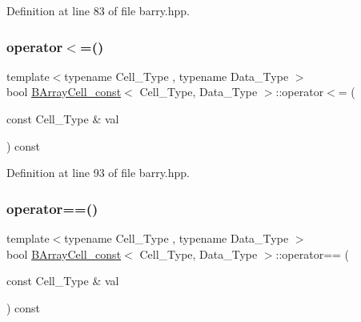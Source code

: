 Definition at line 83 of file barry.\+hpp.

\mbox{\label{classbarry_1_1_b_array_cell__const_a4221856ab5a0b1e149a99e776eee4614}} 
\subsubsection{\texorpdfstring{operator$<$=()}{operator<=()}}
{\footnotesize\ttfamily template$<$typename Cell\+\_\+\+Type , typename Data\+\_\+\+Type $>$ \\
bool \hyperlink{classbarry_1_1_b_array_cell__const}{B\+Array\+Cell\+\_\+const}$<$ Cell\+\_\+\+Type, Data\+\_\+\+Type $>$\+::operator$<$= (\begin{DoxyParamCaption}\item[{const Cell\+\_\+\+Type \&}]{val }\end{DoxyParamCaption}) const\hspace{0.3cm}{\ttfamily [inline]}}



Definition at line 93 of file barry.\+hpp.

\mbox{\label{classbarry_1_1_b_array_cell__const_a267ac042fc28e411ca553f6f61cbe9b3}} 
\subsubsection{\texorpdfstring{operator==()}{operator==()}}
{\footnotesize\ttfamily template$<$typename Cell\+\_\+\+Type , typename Data\+\_\+\+Type $>$ \\
bool \hyperlink{classbarry_1_1_b_array_cell__const}{B\+Array\+Cell\+\_\+const}$<$ Cell\+\_\+\+Type, Data\+\_\+\+Type $>$\+::operator== (\begin{DoxyParamCaption}\item[{const Cell\+\_\+\+Type \&}]{val }\end{DoxyParamCaption}) const\hspace{0.3cm}{\ttfamily [inline]}}




